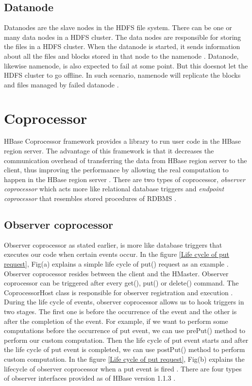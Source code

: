 \documentclass[11pt,a4paper,bibtotoc,idxtotoc,headsepline,footsepline,footexclude,BCOR12mm,DIV13]{scrbook}
\begin{document}
\subsection{Datanode}
\label{DataNode}
Datanodes are the slave nodes in the HDFS file system. There can be one or many data nodes in a HDFS cluster. The data nodes are responsible for storing the files in a HDFS cluster. When the datanode is started, it sends information about all the files and blocks stored in that node to the namenode \cite{HDFS:datanode}. Datanode, likewise namenode, is also expected to fail at some point. But this doesnot let the HDFS cluster to go offline. In such scenario, namenode will replicate the blocks and files managed by failed datanode \cite{HDFS:namenodeanddatanode}. 


\section{Coprocessor}
\label{sec:coprocessor}

HBase Coprocessor framework provides a library to run user code in the HBase region server. The advantage of this framework is that it decreases the communication overhead of transferring the data from HBase region server to the client, thus improving the performance by allowing the real computation to happen in the HBase region server \cite{coprocessor:coprocessor}. There are two types of coprocessor, \emph{observer coprocessor}  which acts more like relational database triggers and \emph{endpoint coprocessor} that resembles stored procedures of RDBMS \cite{coprocessor:types}. 


\subsection{Observer coprocessor}
\label{sec:observercoprocessor}
Observer coprocessor as stated earlier, is more like database triggers that executes our code when certain events occur. In the figure \ref{Life cycle of put request}, Fig(a) explains a simple life cycle of put() request as an example \cite{coprocessor:detail}. Observer coprocessor resides between the client and the HMaster. Observer coprocessor can be triggered after every get(), put() or delete() command. The CoprocessorHost class is responsible for observer registration and execution \cite{coprocessor:detail}.  During the life cycle of events, observer coprocessor allows us to hook triggers in two stages. The first one is before the occurrence of the event and the other is after the completion of the event. For example, if we want to perform some computations before the occurrence of put event, we can use prePut() method to perform our custom computation. Then the life cycle of put event starts and after the life cycle of put event is completed, we can use postPut() method to perform custom computation. In the figure \ref{Life cycle of put request}, Fig(b) explains the lifecycle of observer coprocessor when a put event is fired \cite{coprocessor:detail}.
\newline
There are four types of observer interfaces provided as of HBase version 1.1.3 \cite{hbase:essential}.
\end{document}
